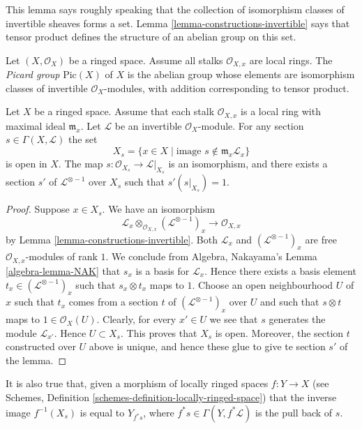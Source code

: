 \noindent
This lemma says roughly speaking that the collection of
isomorphism classes of invertible sheaves forms a set.
Lemma \ref{lemma-constructions-invertible} says that
tensor product defines the structure of an abelian group
on this set.

\begin{definition}
\label{definition-pic}
Let $(X, \mathcal{O}_X)$ be a ringed space.
Assume all stalks $\mathcal{O}_{X, x}$ are local rings.
The {\it Picard group} $\text{Pic}(X)$ of $X$ is the
abelian group whose elements are isomorphism classes of
invertible $\mathcal{O}_X$-modules, with addition
corresponding to tensor product.
\end{definition}

\begin{lemma}
\label{lemma-s-open}
Let $X$ be a ringed space. Assume that each stalk $\mathcal{O}_{X, x}$
is a local ring with maximal ideal $\mathfrak m_x$.
Let $\mathcal{L}$ be an invertible $\mathcal{O}_X$-module.
For any section $s \in \Gamma(X, \mathcal{L})$ the set
$$
X_s = \{x \in X \mid \text{image }s \not\in \mathfrak m_x\mathcal{L}_x\}
$$
is open in $X$. The map $s : \mathcal{O}_{X_s} \to \mathcal{L}|_{X_s}$
is an isomorphism, and there exists a section $s'$
of $\mathcal{L}^{\otimes -1}$ over $X_s$ such that $s' (s|_{X_s}) = 1$.
\end{lemma}

\begin{proof}
Suppose $x \in X_s$.
We have an isomorphism
$$
\mathcal{L}_x \otimes_{\mathcal{O}_{X, x}} (\mathcal{L}^{\otimes -1})_x
\longrightarrow
\mathcal{O}_{X, x}
$$
by Lemma \ref{lemma-constructions-invertible}.
Both $\mathcal{L}_x$ and $(\mathcal{L}^{\otimes -1})_x$
are free $\mathcal{O}_{X, x}$-modules of rank $1$. We conclude
from Algebra, Nakayama's Lemma \ref{algebra-lemma-NAK} that
$s_x$ is a basis for $\mathcal{L}_x$. Hence there exists
a basis element $t_x \in (\mathcal{L}^{\otimes -1})_x$
such that $s_x \otimes t_x$ maps to $1$.
Choose an open neighbourhood $U$ of
$x$ such that $t_x$ comes from a section $t$
of $(\mathcal{L}^{\otimes -1})_x$ over $U$ and such that
$s \otimes t$ maps to $1 \in \mathcal{O}_X(U)$.
Clearly, for every $x' \in U$ we see that $s$ generates
the module $\mathcal{L}_{x'}$. Hence $U \subset X_s$.
This proves that $X_s$ is open. Moreover, the section
$t$ constructed over $U$ above is unique, and hence
these glue to give te section $s'$ of the lemma.
\end{proof}

\noindent
It is also true that, given a morphism of locally ringed
spaces $f : Y \to X$
(see Schemes, Definition \ref{schemes-definition-locally-ringed-space})
that the inverse image $f^{-1}(X_s)$ is equal to $Y_{f^*s}$, where
$f^*s \in \Gamma(Y, f^*\mathcal{L})$ is the pull back of $s$.




